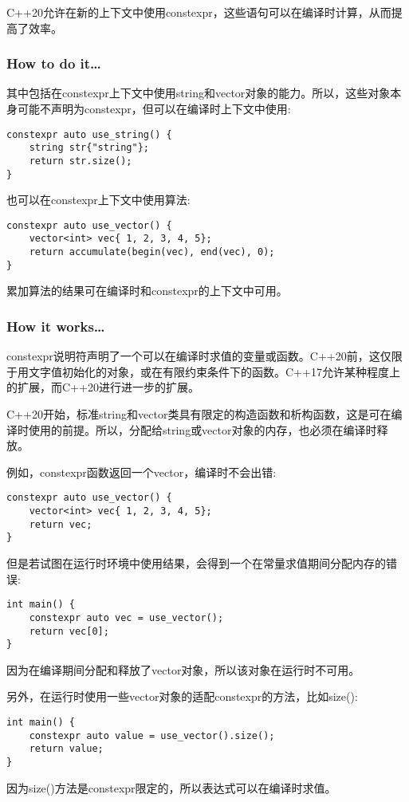 
C++20允许在新的上下文中使用constexpr，这些语句可以在编译时计算，从而提高了效率。

\subsubsection{How to do it…}

其中包括在constexpr上下文中使用string和vector对象的能力。所以，这些对象本身可能不声明为constexpr，但可以在编译时上下文中使用:

\begin{lstlisting}[style=styleCXX]
constexpr auto use_string() {
	string str{"string"};
	return str.size();
}
\end{lstlisting}

也可以在constexpr上下文中使用算法:

\begin{lstlisting}[style=styleCXX]
constexpr auto use_vector() {
	vector<int> vec{ 1, 2, 3, 4, 5};
	return accumulate(begin(vec), end(vec), 0);
}
\end{lstlisting}

累加算法的结果可在编译时和constexpr的上下文中可用。

\subsubsection{How it works…}

constexpr说明符声明了一个可以在编译时求值的变量或函数。C++20前，这仅限于用文字值初始化的对象，或在有限约束条件下的函数。C++17允许某种程度上的扩展，而C++20进行进一步的扩展。

C++20开始，标准string和vector类具有限定的构造函数和析构函数，这是可在编译时使用的前提。所以，分配给string或vector对象的内存，也必须在编译时释放。

例如，constexpr函数返回一个vector，编译时不会出错:

\begin{lstlisting}[style=styleCXX]
constexpr auto use_vector() {
	vector<int> vec{ 1, 2, 3, 4, 5};
	return vec;
}
\end{lstlisting}

但是若试图在运行时环境中使用结果，会得到一个在常量求值期间分配内存的错误:

\begin{lstlisting}[style=styleCXX]
int main() {
	constexpr auto vec = use_vector();
	return vec[0];
}
\end{lstlisting}

因为在编译期间分配和释放了vector对象，所以该对象在运行时不可用。

另外，在运行时使用一些vector对象的适配constexpr的方法，比如size():

\begin{lstlisting}[style=styleCXX]
int main() {
	constexpr auto value = use_vector().size();
	return value;
}
\end{lstlisting}

因为size()方法是constexpr限定的，所以表达式可以在编译时求值。












